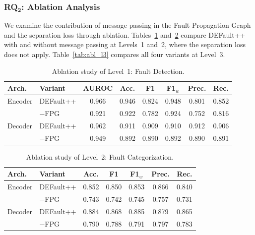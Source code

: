 \subsubsection{\textbf{RQ$\mathbf{_2}$:} Ablation Analysis}
\label{sec:defaultpp_rq2}

We examine the contribution of message passing in the Fault Propagation Graph and the separation loss through ablation. Tables~\ref{tab:abl_l1} and~\ref{tab:abl_l2} compare DEFault++ with and without message passing at Levels~1 and~2, where the separation loss does not apply. Table~\ref{tab:abl_l3} compares all four variants at Level~3.

\begin{table}[t]
\centering
\caption{Ablation study of Level~1: Fault Detection.}
\label{tab:abl_l1}
\small
\begin{tabular}{l l c c c c c c}
\toprule
\textbf{Arch.} & \textbf{Variant} & \textbf{AUROC} & \textbf{Acc.} & \textbf{F1} & \textbf{F1$_w$} & \textbf{Prec.} & \textbf{Rec.} \\
\midrule
Encoder & DEFault++ & 0.966 & 0.946 & 0.824 & 0.948 & 0.801 & 0.852 \\
        & $-$FPG & 0.921 & 0.922 & 0.782 & 0.924 & 0.752 & 0.816 \\
\midrule
Decoder & DEFault++ & 0.962 & 0.911 & 0.909 & 0.910 & 0.912 & 0.906 \\
        & $-$FPG & 0.949 & 0.892 & 0.890 & 0.892 & 0.890 & 0.891 \\
\bottomrule
\end{tabular}
\end{table}

\begin{table}[t]
\centering
\caption{Ablation study of Level~2: Fault Categorization.}
\label{tab:abl_l2}
\small
\begin{tabular}{l l c c c c c}
\toprule
\textbf{Arch.} & \textbf{Variant} & \textbf{Acc.} & \textbf{F1} & \textbf{F1$_w$} & \textbf{Prec.} & \textbf{Rec.} \\
\midrule
Encoder & DEFault++ & 0.852 & 0.850 & 0.853 & 0.866 & 0.840 \\
        & $-$FPG & 0.743 & 0.742 & 0.745 & 0.757 & 0.731 \\
\midrule
Decoder & DEFault++ & 0.884 & 0.868 & 0.885 & 0.879 & 0.865 \\
        & $-$FPG & 0.790 & 0.788 & 0.791 & 0.797 & 0.783 \\
\bottomrule
\end{tabular}
\end{table}


